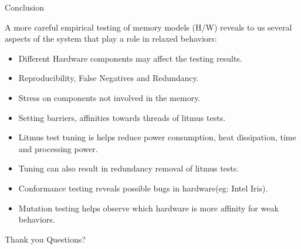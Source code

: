 \documentclass{beamer}
\begin{document}
    \begin{frame}{Conclusion}
        
        A more careful empirical testing of memory models (H/W) reveals to us several aspects of the system that play a role in relaxed behaviors:
        \begin{itemize}
            \item Different Hardware components may affect the testing results.
            \item Reproducibility, False Negatives and Redundancy.
            \item Stress on components not involved in the memory.
            \item Setting barriers, affinities towards threads of litmus tests.
            \item Litmus test tuning is helps reduce power consumption, heat dissipation, time and processing power.
            \item Tuning can also result in redundancy removal of litmus tests.
            \item Conformance testing reveals possible bugs in hardware(eg: Intel Iris).
            \item Mutation testing helps observe which hardware is more affinity for weak behaviors.
        \end{itemize}
        
    \end{frame}

    \begin{frame}{Thank you}
        Questions?
    \end{frame}
\end{document}
